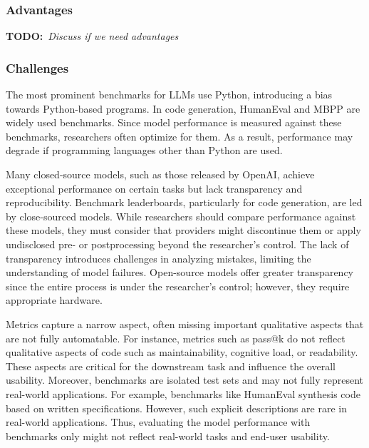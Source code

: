 \documentclass[11pt]{article}
\newcommand{\todo}[1]{{\textbf{TODO:}\ \textit{#1}}} %
\begin{document}
\subsubsection{Advantages}

\todo{Discuss if we need advantages}


\subsubsection{Challenges}

The most prominent benchmarks for LLMs use Python, introducing a bias towards Python-based programs.
In code generation, HumanEval and MBPP are widely used benchmarks.
Since model performance is measured against these benchmarks, researchers often optimize for them.
As a result, performance may degrade if programming languages other than Python are used.

Many closed-source models, such as those released by OpenAI, achieve exceptional performance on certain tasks but lack transparency and reproducibility.
Benchmark leaderboards, particularly for code generation, are led by close-sourced models.
While researchers should compare performance against these models, they must consider that providers might discontinue them or apply undisclosed pre- or postprocessing beyond the researcher's control.
The lack of transparency introduces challenges in analyzing mistakes, limiting the understanding of model failures.
Open-source models offer greater transparency since the entire process is under the researcher's control; however, they require appropriate hardware.

Metrics capture a narrow aspect, often missing important qualitative aspects that are not fully automatable.
For instance, metrics such as pass@k do not reflect qualitative aspects of code such as maintainability, cognitive load, or readability.
These aspects are critical for the downstream task and influence the overall usability.
Moreover, benchmarks are isolated test sets and may not fully represent real-world applications.
For example, benchmarks like HumanEval synthesis code based on written specifications.
However, such explicit descriptions are rare in real-world applications.
Thus, evaluating the model performance with benchmarks only might not reflect real-world tasks and end-user usability.
\end{document}
